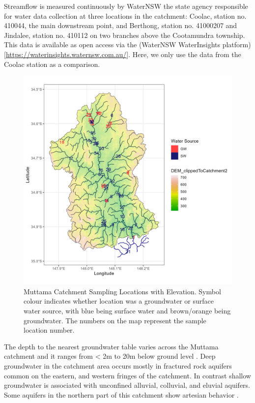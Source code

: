 \documentclass[, manuscript]{copernicus}
\begin{document}
Streamflow is measured continuously by WaterNSW the state agency
responsible for water data collection at three locations in the
catchment: Coolac, station no. 410044, the main downstream point, and
Berthong, station no. 41000207 and Jindalee, station no. 410112 on two
branches above the Cootamundra township. This data is available as open
access via the (WaterNSW WaterInsights
platform){[}\url{https://waterinsights.waternsw.com.au/}{]}. Here, we
only use the data from the Coolac station as a comparison.

\clearpage

\begin{figure}
\includegraphics[width=0.8\linewidth]{Figures/gw_or_sw_map} \caption{Muttama Catchment Sampling Locations with Elevation. Symbol colour indicates whether location was a groundwater or surface water source, with blue being surface water and brown/orange being groundwater. The numbers on the map represent the sample location number.}\label{fig:samplemap}
\end{figure}

The depth to the nearest groundwater table varies across the Muttama
catchment and it ranges from \textless{} 2m to 20m below ground level
\citep{DECC2009}. Deep groundwater in the catchment area occurs mostly
in fractured rock aquifers common on the eastern, and western fringes of
the catchment. In contrast shallow groundwater is associated with
unconfined alluvial, colluvial, and eluvial aquifers. Some aquifers in
the northern part of this catchment show artesian behavior
\citep{Webb1999, Akter2018}.
\end{document}
